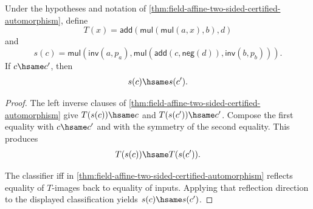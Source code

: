 \begin{theorem}
\label{thm:field-affine-explicit-inverse-classifier-congruence}
Under the hypotheses and notation of
\autoref{thm:field-affine-two-sided-certified-automorphism}, define
$$
T(x)=\mathsf{add}(\mathsf{mul}(\mathsf{mul}(a,x),b),d)
$$
and
$$
s(c)=
\mathsf{mul}(\mathsf{inv}(a,p_a),
\mathsf{mul}(\mathsf{add}(c,\mathsf{neg}(d)),\mathsf{inv}(b,p_b))).
$$
If $c\hsame c'$, then
$$
s(c)\hsame s(c').
$$
\end{theorem}
\begin{proof}
The left inverse clauses of
\autoref{thm:field-affine-two-sided-certified-automorphism} give
$T(s(c))\hsame c$ and $T(s(c'))\hsame c'$. Compose the first equality with
$c\hsame c'$ and with the symmetry of the second equality. This produces
$$
T(s(c))\hsame T(s(c')).
$$

The classifier iff in
\autoref{thm:field-affine-two-sided-certified-automorphism} reflects equality
of $T$-images back to equality of inputs. Applying that reflection direction to
the displayed classification yields $s(c)\hsame s(c')$.
\end{proof}

